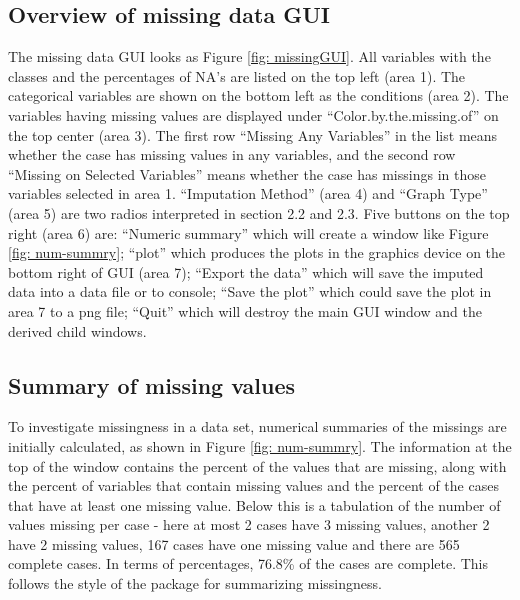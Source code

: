\documentclass[article]{jss}
\begin{document}
\subsection{Overview of missing data GUI}

The missing data GUI looks as Figure \ref{fig: missingGUI}. All variables with the classes and the percentages of NA's are listed on the top left (area 1). The categorical variables are shown on the bottom left as the conditions (area 2). The variables having missing values are displayed under ``Color.by.the.missing.of'' on the top center (area 3). The first row ``Missing Any Variables'' in the list means whether the case has missing values in any variables, and the second row ``Missing on Selected Variables'' means whether the case has missings in those variables selected in area 1. ``Imputation Method'' (area 4) and ``Graph Type'' (area 5) are two radios interpreted in section 2.2 and 2.3. Five buttons on the top right (area 6) are: ``Numeric summary'' which will create a window like Figure \ref{fig: num-summry}; ``plot'' which produces the plots in the graphics device on the bottom right of GUI (area 7); ``Export the data'' which will save the imputed data into a data file or to  console; ``Save the plot'' which could save the plot in area 7 to a png file; ``Quit'' which will destroy the main GUI window and the derived child windows.

\subsection{Summary of missing values}

To investigate missingness in a data set, numerical summaries of the missings are initially calculated, as shown in Figure \ref{fig: num-summry}. The information at the top of the window contains the percent of the values that are missing, along with the percent of variables that contain missing values and the percent of the cases that have at least one missing value. Below this is a tabulation of the number of values missing per case - here at most 2 cases have 3 missing values, another 2 have 2 missing values, 167 cases have one missing value and there are 565 complete cases. In terms of percentages, 76.8\% of the cases are complete. This follows the style of the  package for summarizing missingness.
\end{document}
